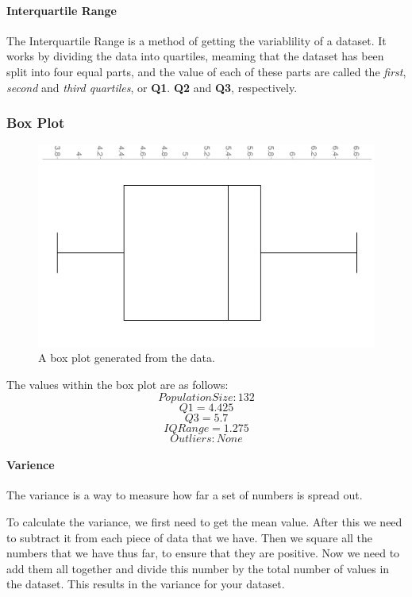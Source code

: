 \documentclass[a4paper,12pt]{article}
\begin{document}
\paragraph{Interquartile Range}
The Interquartile Range is a method of getting the variablility of a dataset. It works by dividing the data into quartiles, meaming that the dataset has been split into four equal parts, and the value of each of these parts are called the \textit{first}, \textit{second} and \textit{third quartiles}, or \textbf{Q1}. \textbf{Q2} and \textbf{Q3}, respectively.

\newpage

\subsubsection{Box Plot}
\begin{figure}[h!]
  \includegraphics[width=\linewidth]{boxplot.jpg}
  \caption{A box plot generated from the data.}
  \label{fig:chart2}
\end{figure}

The values within the box plot are as follows:
\[
  Population Size: 132
\]
\[
  Q1 = 4.425
\]
\[
  Q3 = 5.7
\]
\[
  IQ Range = 1.275
\]
\[
  Outliers: None
\]

\paragraph{Varience}
The variance is a way to measure how far a set of numbers is spread out.

To calculate the variance, we first need to get the mean value. After this we need to subtract it from each piece of data that we have. Then we square all the numbers that we have thus far, to ensure that they are positive. Now we need to add them all together and divide this number by the total number of values in the dataset. This results in the variance for your dataset.
\end{document}
